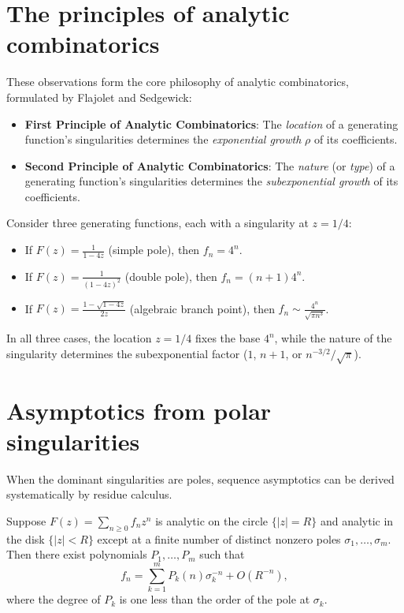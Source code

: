 \section*{The principles of analytic combinatorics}

These observations form the core philosophy of analytic combinatorics, formulated by Flajolet and Sedgewick:

\begin{itemize}
    \item \textbf{First Principle of Analytic Combinatorics}: The \emph{location} of a generating function's singularities determines the \emph{exponential growth} \(\rho\) of its coefficients.
    \item \textbf{Second Principle of Analytic Combinatorics}: The \emph{nature} (or \emph{type}) of a generating function's singularities determines the \emph{subexponential growth} of its coefficients.
\end{itemize}

\begin{example}
    Consider three generating functions, each with a singularity at \(z = 1/4\):
    \begin{itemize}
        \item If \(F(z) = \frac{1}{1 - 4z}\) (simple pole), then \(f_n = 4^n\).
        \item If \(F(z) = \frac{1}{(1 - 4z)^2}\) (double pole), then \(f_n = (n + 1) 4^n\).
        \item If \(F(z) = \frac{1 - \sqrt{1 - 4z}}{2z}\) (algebraic branch point), then \(f_n \sim \frac{4^n}{\sqrt{\pi n^3}}\).
    \end{itemize}
    In all three cases, the location \(z = 1/4\) fixes the base \(4^n\), while the nature of the singularity determines the subexponential factor (\(1\), \(n+1\), or \(n^{-3/2}/\sqrt{\pi}\)).
\end{example}


\section*{Asymptotics from polar singularities}

When the dominant singularities are poles, sequence asymptotics can be derived systematically by residue calculus.

\begin{proposition}
    \label{prop:rational-asymptotics}
    Suppose \(F(z) = \sum_{n \ge 0} f_n z^n\) is analytic on the circle \(\{|z| = R\}\) and analytic in the disk \(\{|z| < R\}\) except at a finite number of distinct nonzero poles \(\sigma_1, \dots, \sigma_m\).
    Then there exist polynomials \(P_1, \dots, P_m\) such that
    \[
        f_n = \sum_{k=1}^m P_k(n) \sigma_k^{-n} + O(R^{-n}),
    \]
    where the degree of \(P_k\) is one less than the order of the pole at \(\sigma_k\).
\end{proposition}

